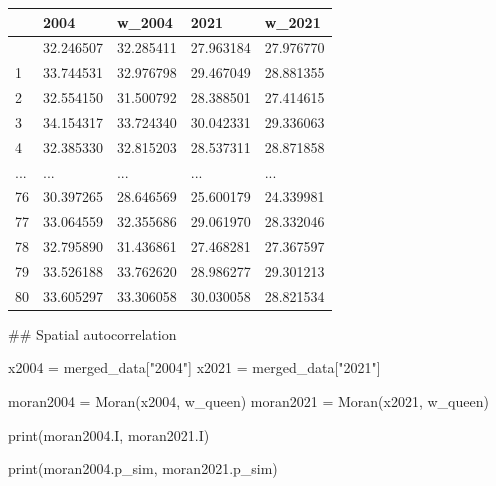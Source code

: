 \documentclass[
  letterpaper,
  DIV=11,
  numbers=noendperiod]{scrreprt}
\newenvironment{Shaded}{\begin{snugshade}}{\end{snugshade}}
\newcommand{\BuiltInTok}[1]{\textcolor[rgb]{0.00,0.23,0.31}{#1}}
\newcommand{\CommentTok}[1]{\textcolor[rgb]{0.37,0.37,0.37}{#1}}
\newcommand{\NormalTok}[1]{\textcolor[rgb]{0.00,0.23,0.31}{#1}}
\newcommand{\OperatorTok}[1]{\textcolor[rgb]{0.37,0.37,0.37}{#1}}
\newcommand{\StringTok}[1]{\textcolor[rgb]{0.13,0.47,0.30}{#1}}
\begin{document}
\begin{longtable}[]{@{}lllll@{}}
\toprule\noalign{}
& 2004 & w\_2004 & 2021 & w\_2021 \\
\midrule\noalign{}
\endhead
\bottomrule\noalign{}
\endlastfoot
0 & 32.246507 & 32.285411 & 27.963184 & 27.976770 \\
1 & 33.744531 & 32.976798 & 29.467049 & 28.881355 \\
2 & 32.554150 & 31.500792 & 28.388501 & 27.414615 \\
3 & 34.154317 & 33.724340 & 30.042331 & 29.336063 \\
4 & 32.385330 & 32.815203 & 28.537311 & 28.871858 \\
... & ... & ... & ... & ... \\
76 & 30.397265 & 28.646569 & 25.600179 & 24.339981 \\
77 & 33.064559 & 32.355686 & 29.061970 & 28.332046 \\
78 & 32.795890 & 31.436861 & 27.468281 & 27.367597 \\
79 & 33.526188 & 33.762620 & 28.986277 & 29.301213 \\
80 & 33.605297 & 33.306058 & 30.030058 & 28.821534 \\
\end{longtable}

\begin{Shaded}
\begin{Highlighting}[]
\CommentTok{\#\# Spatial autocorrelation}
\end{Highlighting}
\end{Shaded}

\begin{Shaded}
\begin{Highlighting}[]
\NormalTok{x2004 }\OperatorTok{=}\NormalTok{ merged\_data[}\StringTok{"2004"}\NormalTok{]}
\NormalTok{x2021 }\OperatorTok{=}\NormalTok{ merged\_data[}\StringTok{"2021"}\NormalTok{]}
\end{Highlighting}
\end{Shaded}

\begin{Shaded}
\begin{Highlighting}[]
\NormalTok{moran2004 }\OperatorTok{=}\NormalTok{ Moran(x2004, w\_queen)}
\NormalTok{moran2021 }\OperatorTok{=}\NormalTok{ Moran(x2021, w\_queen)}
\end{Highlighting}
\end{Shaded}

\begin{Shaded}
\begin{Highlighting}[]
\BuiltInTok{print}\NormalTok{(moran2004.I, moran2021.I)}

\BuiltInTok{print}\NormalTok{(moran2004.p\_sim, moran2021.p\_sim)}
\end{Highlighting}
\end{Shaded}
\end{document}
